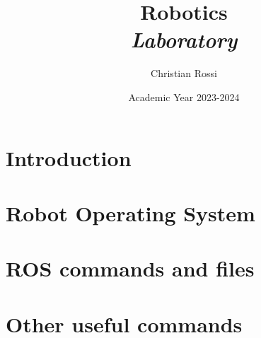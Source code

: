 \documentclass[12pt, a4paper]{report}
\title{Robotics \\ \textit{Laboratory}}
\author{Christian Rossi}
\date{Academic Year 2023-2024}
\begin{document}
    \maketitle

    

    \cleardoublepage{}

    \tableofcontents

    \cleardoublepage{}

    \chapter{Introduction}
    
    

    \chapter{Robot Operating System}
    
    
    

    \chapter{ROS commands and files}
    
     
     
     
     
     
     
     
     
     

    \appendix
    \chapter{Other useful commands}
    
\end{document}
